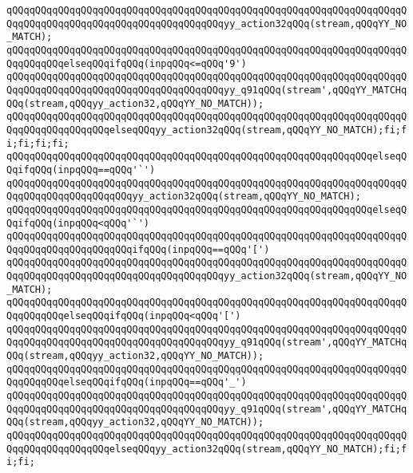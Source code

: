 \verb|qQQqqQQqqQQqqQQqqQQqqQQqqQQqqQQqqQQqqQQqqQQqqQQqqQQqqQQqqQQqqQQqqQQqqQQqqQQqqQQqqQQqqQQqqQQqqQQqqQQqqQQqqQQqyy_action32qQQq(stream,qQQqYY_NO_MATCH);|\newline
\verb|qQQqqQQqqQQqqQQqqQQqqQQqqQQqqQQqqQQqqQQqqQQqqQQqqQQqqQQqqQQqqQQqqQQqqQQqqQQqqQQqelseqQQqifqQQq(inpqQQq<=qQQq'9')|\newline
\verb|qQQqqQQqqQQqqQQqqQQqqQQqqQQqqQQqqQQqqQQqqQQqqQQqqQQqqQQqqQQqqQQqqQQqqQQqqQQqqQQqqQQqqQQqqQQqqQQqqQQqqQQqqQQqyy_q91qQQq(stream',qQQqYY_MATCHqQQq(stream,qQQqyy_action32,qQQqYY_NO_MATCH));|\newline
\verb|qQQqqQQqqQQqqQQqqQQqqQQqqQQqqQQqqQQqqQQqqQQqqQQqqQQqqQQqqQQqqQQqqQQqqQQqqQQqqQQqqQQqqQQqelseqQQqyy_action32qQQq(stream,qQQqYY_NO_MATCH);fi;fi;fi;fi;fi;|\newline
\verb|qQQqqQQqqQQqqQQqqQQqqQQqqQQqqQQqqQQqqQQqqQQqqQQqqQQqqQQqqQQqqQQqelseqQQqifqQQq(inpqQQq==qQQq'`')|\newline
\verb|qQQqqQQqqQQqqQQqqQQqqQQqqQQqqQQqqQQqqQQqqQQqqQQqqQQqqQQqqQQqqQQqqQQqqQQqqQQqqQQqqQQqqQQqqQQqyy_action32qQQq(stream,qQQqYY_NO_MATCH);|\newline
\verb|qQQqqQQqqQQqqQQqqQQqqQQqqQQqqQQqqQQqqQQqqQQqqQQqqQQqqQQqqQQqqQQqelseqQQqifqQQq(inpqQQq<qQQq'`')|\newline
\verb|qQQqqQQqqQQqqQQqqQQqqQQqqQQqqQQqqQQqqQQqqQQqqQQqqQQqqQQqqQQqqQQqqQQqqQQqqQQqqQQqqQQqqQQqqQQqifqQQq(inpqQQq==qQQq'[')|\newline
\verb|qQQqqQQqqQQqqQQqqQQqqQQqqQQqqQQqqQQqqQQqqQQqqQQqqQQqqQQqqQQqqQQqqQQqqQQqqQQqqQQqqQQqqQQqqQQqqQQqqQQqqQQqqQQqyy_action32qQQq(stream,qQQqYY_NO_MATCH);|\newline
\verb|qQQqqQQqqQQqqQQqqQQqqQQqqQQqqQQqqQQqqQQqqQQqqQQqqQQqqQQqqQQqqQQqqQQqqQQqqQQqqQQqelseqQQqifqQQq(inpqQQq<qQQq'[')|\newline
\verb|qQQqqQQqqQQqqQQqqQQqqQQqqQQqqQQqqQQqqQQqqQQqqQQqqQQqqQQqqQQqqQQqqQQqqQQqqQQqqQQqqQQqqQQqqQQqqQQqqQQqqQQqqQQqyy_q91qQQq(stream',qQQqYY_MATCHqQQq(stream,qQQqyy_action32,qQQqYY_NO_MATCH));|\newline
\verb|qQQqqQQqqQQqqQQqqQQqqQQqqQQqqQQqqQQqqQQqqQQqqQQqqQQqqQQqqQQqqQQqqQQqqQQqqQQqqQQqelseqQQqifqQQq(inpqQQq==qQQq'_')|\newline
\verb|qQQqqQQqqQQqqQQqqQQqqQQqqQQqqQQqqQQqqQQqqQQqqQQqqQQqqQQqqQQqqQQqqQQqqQQqqQQqqQQqqQQqqQQqqQQqqQQqqQQqqQQqqQQqyy_q91qQQq(stream',qQQqYY_MATCHqQQq(stream,qQQqyy_action32,qQQqYY_NO_MATCH));|\newline
\verb|qQQqqQQqqQQqqQQqqQQqqQQqqQQqqQQqqQQqqQQqqQQqqQQqqQQqqQQqqQQqqQQqqQQqqQQqqQQqqQQqqQQqqQQqelseqQQqyy_action32qQQq(stream,qQQqYY_NO_MATCH);fi;fi;fi;|\newline
